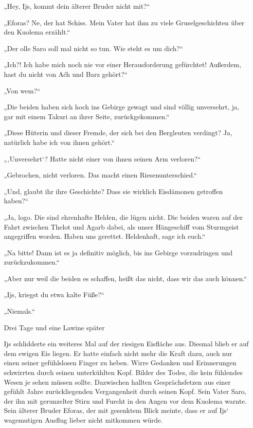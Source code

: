 „Hey, Ijs, kommt dein älterer Bruder nicht mit?“

„Eforas? Ne, der hat Schiss. Mein Vater hat ihm zu viele Gruselgeschichten über den Kuolema erzählt.“

„Der olle Saro soll mal nicht so tun. Wie steht es um dich?“

„Ich?! Ich habe mich noch nie vor einer Herausforderung gefürchtet! Außerdem, hast du nicht von Aćh und Barz gehört?“

„Von wem?“

„Die beiden haben sich hoch ins Gebirge gewagt und sind völlig unversehrt, ja, gar mit einem Takuri an ihrer Seite, zurückgekommen.“

„Diese Hüterin und dieser Fremde, der sich bei den Bergleuten verdingt? Ja, natürlich habe ich von ihnen gehört.“

„‚Unversehrt‘? Hatte nicht einer von ihnen seinen Arm verloren?“

„Gebrochen, nicht verloren. Das macht einen Riesenunterschied.“

„Und, glaubt ihr ihre Geschichte? Dass sie wirklich Eisdämonen getroffen haben?“

„Ja, logo. Die sind ehrenhafte Helden, die lügen nicht. Die beiden waren auf der Fahrt zwischen Thelot und Agarb dabei, als unser Hängeschiff vom Sturmgeist angegriffen worden. Haben uns gerettet. Heldenhaft, sage ich euch.“

„Na bitte! Dann ist es ja definitiv möglich, bis ins Gebirge vorzudringen und zurückzukommen.“

„Aber nur weil die beiden es schaffen, heißt das nicht, dass wir das auch können.“

„Ijs, kriegst du etwa kalte Füße?“

„Niemals.“



\trennzeichen



Drei Tage und eine Lawine später\bigskip



Ijs schlidderte ein weiteres Mal auf der riesigen Eisfläche aus. Diesmal blieb er auf dem ewigen Eis liegen. Er hatte einfach nicht mehr die Kraft dazu, auch nur einen seiner gefühlslosen Finger zu heben. Wirre Gedanken und Erinnerungen schwirrten durch seinen unterkühlten Kopf. Bilder des Todes, die kein fühlendes Wesen je sehen müssen sollte. Dazwischen hallten Gesprächsfetzen aus einer gefühlt Jahre zurückliegenden Vergangenheit durch seinen Kopf. Sein Vater Saro, der ihn mit gerunzelter Stirn und Furcht in den Augen vor dem Kuolema warnte. Sein älterer Bruder Eforas, der mit gesenktem Blick meinte, dass er auf Ijs‘ wagemutigen Ausflug lieber nicht mitkommen würde.

